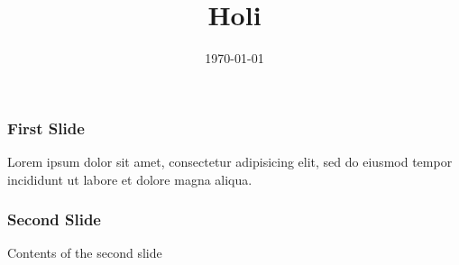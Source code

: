 \documentclass{beamer}
\title{Holi}
\date{\today}
\begin{document}
 
\maketitle 
\begin{frame} 
\frametitle{First Slide} 
Lorem ipsum dolor sit amet, consectetur adipisicing elit, sed do eiusmod tempor incididunt ut labore et dolore magna aliqua. 
\end{frame} 
\begin{frame} 
\frametitle{Second Slide} 
Contents of the second slide 
\end{frame} 
\end{document}
